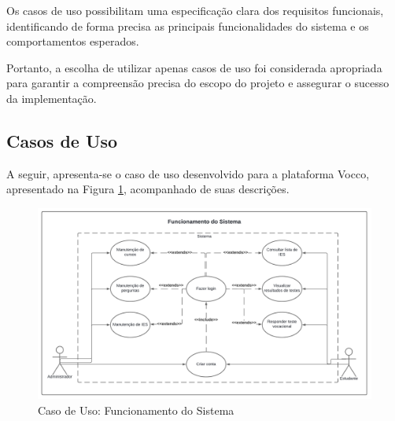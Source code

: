 Os casos de uso possibilitam uma especificação clara dos requisitos funcionais, identificando de forma precisa as principais funcionalidades do sistema e os comportamentos esperados. 

Portanto, a escolha de utilizar apenas casos de uso foi considerada apropriada para garantir a compreensão precisa do escopo do projeto e assegurar o sucesso da implementação.
\subsection{Casos de Uso}
A seguir, apresenta-se o caso de uso desenvolvido para a plataforma Vocco, apresentado na Figura \ref{casodeuso}, acompanhado de suas descrições. 


        
\begin{figure}[ht]
    \centering
    \includegraphics[scale=0.6]{images/caso-de-uso-funcionamento-sistema.png}
    \caption{Caso de Uso: Funcionamento do Sistema}
    \label{casodeuso}
\end{figure}  


